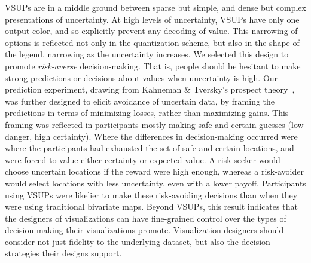 VSUPs are in a middle ground between sparse but simple, and dense but complex presentations of uncertainty. At high levels of uncertainty, VSUPs have only one output color, and so explicitly prevent any decoding of value. This narrowing of options is reflected not only in the quantization scheme, but also in the shape of the legend, narrowing as the uncertainty increases. We selected this design to promote \emph{risk-averse} decision-making. That is, people should be hesitant to make strong predictions or decisions about values when uncertainty is high. Our prediction experiment, drawing from Kahneman \& Tversky's prospect theory~\cite{kahneman1979prospect}, was further designed to elicit avoidance of uncertain data, by framing the predictions in terms of minimizing losses, rather than maximizing gains. This framing was reflected in participants mostly making safe and certain guesses (low danger, high certainty). Where the differences in decision-making occurred were where the participants had exhausted the set of safe and certain locations, and were forced to value either certainty or expected value. A risk seeker would choose uncertain locations if the reward were high enough, whereas a risk-avoider would select locations with less uncertainty, even with a lower payoff. Participants using VSUPs were likelier to make these risk-avoiding decisions than when they were using traditional bivariate maps. Beyond VSUPs, this result indicates that the designers of visualizations can have fine-grained control over the types of decision-making their visualizations promote. Visualization designers should consider not just fidelity to the underlying dataset, but also the decision strategies their designs support.







